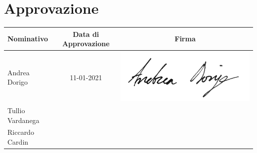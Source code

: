 {\section{Approvazione}\label{OrganigrammaApprovazione}
\quad
\def\tabularxcolumn#1{m{#1}}
{	
	\begin{center}
		\renewcommand{\arraystretch}{1.4}
		\begin{tabularx}{\textwidth}{|X|c|c|}
			\hline
			\rowcolor{airforceblue}
			\textbf{Nominativo} & \textbf{Data di Approvazione} & \textbf{Firma}\\
			\hline
			Andrea Dorigo & 11-01-2021 & \includegraphics[width=0.2\linewidth]{../immagini/firme/firma_andrea_dorigo.png}\\
			\hline
			Tullio Vardanega & &\\
			Riccardo Cardin & &\\
			\hline
		\end{tabularx}
	\end{center}
\clearpage
}}
